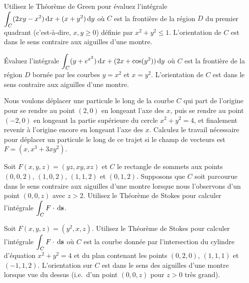 \begin{question}
Utilisez le Théorème de Green pour évaluez l'intégrale
$\displaystyle \int_C(2xy -x^2)\,\mathrm{d}x + (x + y^2)\,\mathrm{d}y$
où $C$ est la frontière de la région $D$ du premier quadrant
(c'est-à-dire, $x,y \geq 0$) définie par $x^2 + y^2 \leq 1$.
L'orientation de $C$ est dans le sens contraire aux aiguilles d'une
montre.
\label{17Q22}
\end{question}

\begin{question}
Évaluez l'intégrale
$\displaystyle \int_C(y+e^{x^2})\,\mathrm{d}x + (2x + \cos(y^2))\,\mathrm{d}y$
où $C$ est la frontière de la région $D$ bornée par les courbes
$y=x^2$ et $x = y^2$.  L'orientation de $C$ est dans le sens contraire
aux aiguilles d'une montre.
\label{17Q23}
\end{question}

\begin{question}
Nous voulons déplacer une particule le long de la courbe $C$ qui part de
l'origine pour se rendre au point $(2,0)$ en longeant l'axe des $x$,
puis se rendre au point $(-2,0)$ en longeant la partie supérieure du
cercle $x^2 + y^2 = 4$, et finalement revenir à l'origine encore en
longeant l'axe des $x$.  Calculez le travail nécessaire pour déplacer
un particule le long de ce trajet si le champ de vecteurs est
$F = (x, x^3 + 3 xy^2)$.
\label{17Q24}
\end{question}

\begin{question}
Soit $F(x,y,z) = (yz, xy, xz)$ et $C$ le rectangle de sommets
aux points $(0,0,2)$, $(1,0,2)$, $(1,1,2)$ et $(0,1,2)$.   Supposons
que $C$ soit parcourue dans le sens contraire aux aiguilles d'une
montre lorsque nous l'observons d'un point $(0,0,z)$ avec $z>2$.
Utilisez le Théorème de Stokes pour calculer l'intégrale
$\displaystyle \int_C F \cdot \,\mathrm{d}\mathbf{s}$.
\label{17Q25}
\end{question}

\begin{question}
Soit $F(x,y,z) = (y^2, x, z)$.  Utilisez le Théorème de Stokes
pour calculer l'intégrale
$\displaystyle \int_C F \cdot \,\mathrm{d}\mathbf{s}$
où $C$ est la courbe donnée par l'intersection du cylindre d'équation
$x^2 + y^2 =4$ et du plan contenant les points $(0,2,0)$, $(1,1,1)$ et
$(-1,1,2)$.  L'orientation sur $C$ est dans le sens des aiguilles
d'une montre lorsque vue du dessus (i.e.\ d'un point $(0,0,z)$ pour
$z>0$ très grand).
\label{17Q26}
\end{question}

